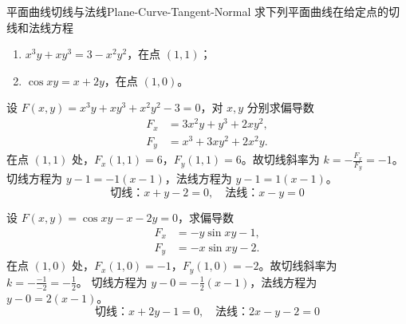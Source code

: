 \begin{problem}{平面曲线切线与法线}{Plane-Curve-Tangent-Normal}
    求下列平面曲线在给定点的切线和法线方程
    \begin{enumerate}
        \item $x^3y + xy^3 = 3 - x^2y^2$，在点 $(1, 1)$；
        \item $\cos xy = x + 2y$，在点 $(1, 0)$。
    \end{enumerate}
\end{problem}

\begin{solution}

    设 $F(x, y) = x^3y + xy^3 + x^2y^2 - 3 = 0$，对 $x, y$ 分别求偏导数
    \begin{equation}
        \label{eq:deriv-16-1}
        \begin{aligned}
            F_x & = 3x^2y + y^3 + 2xy^2, \\
            F_y & = x^3 + 3xy^2 + 2x^2y.
        \end{aligned}
    \end{equation}
    在点 $(1, 1)$ 处，$F_x(1, 1) = 6$，$F_y(1, 1) = 6$。故切线斜率为 $k = -\frac{F_x}{F_y} = -1$。
    切线方程为 $y - 1 = -1(x - 1)$，法线方程为 $y - 1 = 1(x - 1)$。
    \begin{equation}
        \boxed{\text{切线：} x + y - 2 = 0, \quad \text{法线：} x - y = 0}
    \end{equation}


    设 $F(x, y) = \cos xy - x - 2y = 0$，求偏导数
    \begin{equation}
        \label{eq:deriv-16-2}
        \begin{aligned}
            F_x & = -y \sin xy - 1, \\
            F_y & = -x \sin xy - 2.
        \end{aligned}
    \end{equation}
    在点 $(1, 0)$ 处，$F_x(1, 0) = -1$，$F_y(1, 0) = -2$。故切线斜率为 $k = -\frac{-1}{-2} = -\frac{1}{2}$。
    切线方程为 $y - 0 = -\frac{1}{2}(x - 1)$，法线方程为 $y - 0 = 2(x - 1)$。
    \begin{equation}
        \boxed{\text{切线：} x + 2y - 1 = 0, \quad \text{法线：} 2x - y - 2 = 0}
    \end{equation}
\end{solution}


